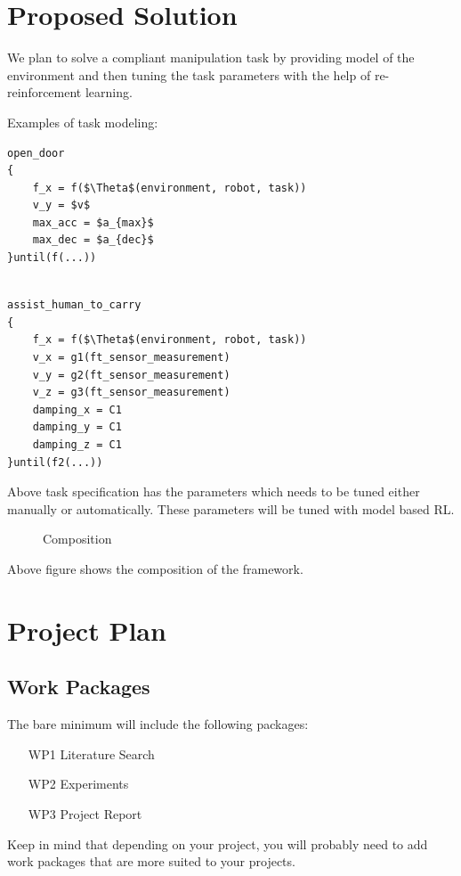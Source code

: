 \documentclass[thesis]{mas_proposal}
\begin{document}
\chapter{Proposed Solution}

We plan to solve a compliant manipulation task by providing model of the environment and then tuning the task parameters with the help of re-reinforcement learning.

Examples of task modeling: 

\begin{lstlisting}[label=open_door_ts,caption=Task specification for opening door]
open_door
{
	f_x = f($\Theta$(environment, robot, task))
	v_y = $v$
	max_acc = $a_{max}$
	max_dec = $a_{dec}$
}until(f(...))

\end{lstlisting}


\begin{lstlisting}[label=assist_ts,caption=Task specification for assisting human]

assist_human_to_carry
{
	f_x = f($\Theta$(environment, robot, task))
	v_x = g1(ft_sensor_measurement)
	v_y = g2(ft_sensor_measurement)
	v_z = g3(ft_sensor_measurement)
	damping_x = C1
	damping_y = C1
	damping_z = C1
}until(f2(...))

\end{lstlisting}

Above task specification has the parameters which needs to be tuned either manually or automatically. These parameters will be tuned with model based RL.

\begin{figure}[!h]
	\caption{\label{fig:composition} Composition}
\end{figure}
Above figure shows the composition of the framework.
\chapter{Project Plan}

\section{Work Packages}
The bare minimum will include the following packages:
\begin{enumerate}
    \item[WP1] Literature Search
    \item[WP2] Experiments
    \item[WP3] Project Report
\end{enumerate}
Keep in mind that depending on your project, you will probably need to add work packages that are more suited to your projects.
\end{document}
